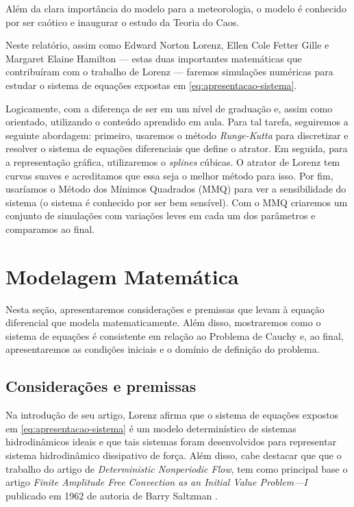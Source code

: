 \documentclass[12pt, a4paper]{article}
\begin{document}
    Além da clara importância do modelo para a meteorologia, o modelo é
    conhecido por ser caótico e inaugurar o estudo da Teoria do Caos.
    
    Neste relatório, assim como Edward Norton Lorenz, Ellen Cole Fetter Gille e
    Margaret Elaine Hamilton — estas duas importantes matemáticas que contribuíram
    com o trabalho de Lorenz — faremos simulações numéricas para estudar o sistema
    de equações expostas em \eqref{eq:apresentacao-sistema}.
    
    Logicamente, com a diferença de ser em um nível de graduação e, assim como
    orientado, utilizando o conteúdo aprendido em aula. Para tal tarefa, seguiremos
    a seguinte abordagem: primeiro, usaremos o método \textit{Runge-Kutta} para
    discretizar e resolver o sistema de equações diferenciais que define o atrator.
    Em seguida, para a representação gráfica, utilizaremos o \textit{splines}
    cúbicas. O atrator de Lorenz tem curvas suaves e acreditamos que essa seja o
    melhor método para isso. Por fim, usaríamos o Método dos Mínimos Quadrados
    (MMQ) para ver a sensibilidade do sistema (o sistema é conhecido por ser bem
    sensível). Com o MMQ criaremos um conjunto de simulações com variações leves em
    cada um dos parâmetros e comparamos ao final.
    
    \newpage
    \section{Modelagem Matemática}
    Nesta seção, apresentaremos considerações e premissas que levam à equação
    diferencial que modela matematicamente. Além disso, mostraremos como o sistema
    de equações é consistente em relação ao Problema de Cauchy e, ao final,
    apresentaremos as condições iniciais e o domínio de definição do problema.
    
    \subsection{Considerações e premissas}
    
    Na introdução de seu artigo, Lorenz afirma que o sistema de equações
    expostos em \eqref{eq:apresentacao-sistema} é um modelo determinístico de
    sistemas hidrodinâmicos ideais e que tais sistemas foram desenvolvidos para
    representar sistema hidrodinâmico dissipativo de força. Além disso, cabe
    destacar que que o trabalho do artigo de \textit{Deterministic Nonperiodic
        Flow}\cite{Lorenz1963}, tem como principal base o artigo \textit{Finite
        Amplitude Free Convection as an Initial Value Problem—I} publicado em 1962
    de
    autoria de Barry Saltzman \cite{Saltzman1962}.
    
\end{document}
